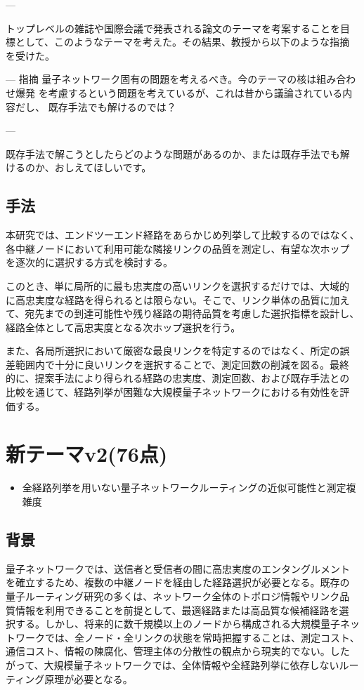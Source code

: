 \documentclass[conference]{IEEEtran}
\begin{document}
--- 

トップレベルの雑誌や国際会議で発表される論文のテーマを考案することを目
標として、このようなテーマを考えた。その結果、教授から以下のような指摘
を受けた。

--- 指摘
量子ネットワーク固有の問題を考えるべき。今のテーマの核は組み合わせ爆発
を考慮するという問題を考えているが、これは昔から議論されている内容だし、
既存手法でも解けるのでは？

---

既存手法で解こうとしたらどのような問題があるのか、または既存手法でも解
けるのか、おしえてほしいです。






\subsection{手法}
\label{sec:orgd24cc3a}

本研究では、エンドツーエンド経路をあらかじめ列挙して比較するのではなく、
各中継ノードにおいて利用可能な隣接リンクの品質を測定し、有望な次ホップ
を逐次的に選択する方式を検討する。

このとき、単に局所的に最も忠実度の高いリンクを選択するだけでは、大域的
に高忠実度な経路を得られるとは限らない。そこで、リンク単体の品質に加え
て、宛先までの到達可能性や残り経路の期待品質を考慮した選択指標を設計し、
経路全体として高忠実度となる次ホップ選択を行う。

また、各局所選択において厳密な最良リンクを特定するのではなく、所定の誤
差範囲内で十分に良いリンクを選択することで、測定回数の削減を図る。最終
的に、提案手法により得られる経路の忠実度、測定回数、および既存手法との
比較を通じて、経路列挙が困難な大規模量子ネットワークにおける有効性を評
価する。


\section{新テーマv2(76点)}
\label{sec:org0a30a63}

\begin{itemize}
\item 全経路列挙を用いない量子ネットワークルーティングの近似可能性と測定複
雑度
\end{itemize}

\subsection{背景}
\label{sec:orgd58f5d3}
量子ネットワークでは、送信者と受信者の間に高忠実度のエンタングルメント
を確立するため、複数の中継ノードを経由した経路選択が必要となる。既存の
量子ルーティング研究の多くは、ネットワーク全体のトポロジ情報やリンク品
質情報を利用できることを前提として、最適経路または高品質な候補経路を選
択する。しかし、将来的に数千規模以上のノードから構成される大規模量子ネッ
トワークでは、全ノード・全リンクの状態を常時把握することは、測定コスト、
通信コスト、情報の陳腐化、管理主体の分散性の観点から現実的でない。した
がって、大規模量子ネットワークでは、全体情報や全経路列挙に依存しないルー
ティング原理が必要となる。
\end{document}
